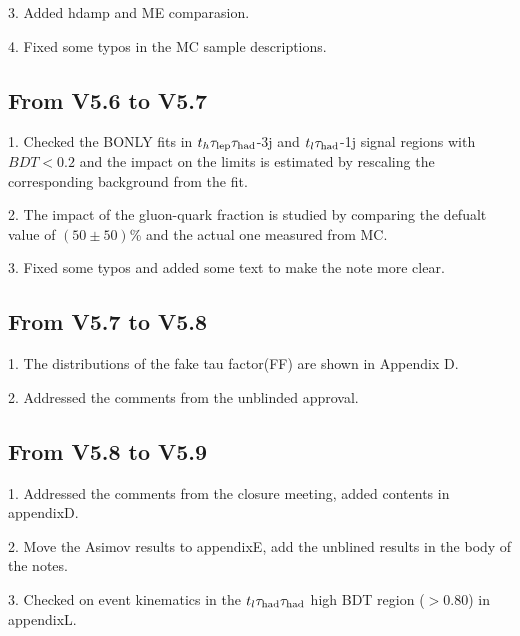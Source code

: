 3. Added hdamp and ME comparasion.

4. Fixed some typos in the MC sample descriptions.

\subsection{From V5.6 to V5.7}

1. Checked the BONLY fits in $t_h\tau_\text{lep}{}\tau_\text{had}$-3j and $t_l\tau_\text{had}$-1j signal regions with $BDT<0.2$ and the impact on the limits is estimated by
rescaling the corresponding background from the fit.

2. The impact of the gluon-quark fraction is studied by comparing the defualt value of $(50\pm50)$\% and the actual one measured from MC.

3. Fixed some typos and added some text to make the note more clear. 

\subsection{From V5.7 to V5.8}

1. The distributions of the fake tau factor(FF) are shown in Appendix D.

2. Addressed the comments from the unblinded approval. 

\subsection{From V5.8 to V5.9}

1. Addressed the comments from the closure meeting, added contents in appendixD.

2. Move the Asimov results to appendixE, add the unblined results in the body of the notes.

3. Checked on event kinematics in the $t_l\tau_\text{had}{}\tau_\text{had}$ high BDT region ($>0.80$) in appendixL.


